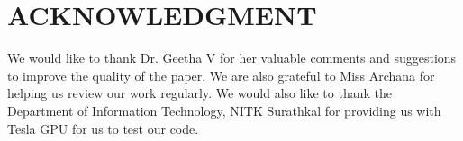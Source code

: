 \documentclass[letterpaper, 10 pt, conference]{ieeeconf}
\begin{document}
    \section*{ACKNOWLEDGMENT}

    We would like to thank Dr. Geetha V for her valuable comments and suggestions to improve the
    quality of the paper. We are also grateful to Miss Archana for helping us review our work regularly. We would also like to thank the Department of Information Technology, NITK Surathkal for providing us with Tesla GPU for us to test our code.


\end{document}
